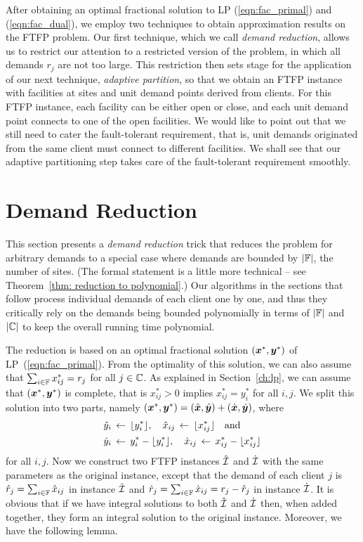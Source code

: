 \documentclass[oneside,final]{ucr}
\begin{document}
After obtaining an optimal fractional solution to LP
(\ref{eqn:fac_primal}) and (\ref{eqn:fac_dual}), we employ
two techniques to obtain approximation results on the FTFP
problem. Our first technique, which we call \emph{demand
  reduction}, allows us to restrict our attention to a
restricted version of the {\FTFP} problem, in which all
demands $r_j$ are not too large. This restriction then sets
stage for the application of our next technique,
\emph{adaptive partition}, so that we obtain an FTFP
instance with facilities at sites and unit demand points
derived from clients. For this FTFP instance, each facility
can be either open or close, and each unit demand point
connects to one of the open facilities. We would like to
point out that we still need to cater the fault-tolerant
requirement, that is, unit demands originated from the same
client must connect to different facilities. We shall see
that our adaptive partitioning step takes care of the
fault-tolerant requirement smoothly.

\section{Demand Reduction}
\label{sec: polynomial demands}

This section presents a \emph{demand reduction} trick that
reduces the problem for arbitrary demands to a special case
where demands are bounded by $|\mathbb{F}|$, the number of
sites.  (The formal statement is a little more technical --
see Theorem~\ref{thm: reduction to polynomial}.)  Our
algorithms in the sections that follow process individual
demands of each client one by one, and thus they critically
rely on the demands being bounded polynomially in terms of
$|\mathbb{F}|$ and $|\mathbb{C}|$ to keep the overall running time polynomial.

The reduction is based on an optimal fractional solution
$(\boldsymbol{x}^\ast,\boldsymbol{y}^\ast)$ of LP~(\ref{eqn:fac_primal}). From
the optimality of this solution, we can also assume that
$\sum_{i\in\mathbb{F}} x^\ast_{ij} = r_j$ for all
$j\in\mathbb{C}$.  As explained in Section~\ref{ch:lp}, we
can assume that $(\boldsymbol{x}^\ast,\boldsymbol{y}^\ast)$ is complete, that is
$x^\ast_{ij} > 0$ implies $x^\ast_{ij} = y^\ast_i$ for all
$i,j$.  We split this solution into two parts, namely
$(\boldsymbol{x}^\ast,\boldsymbol{y}^\ast) = (\hat{\boldsymbol{x}},\hat{\boldsymbol{y}})+
(\dot{\boldsymbol{x}},\dot{\boldsymbol{y}})$, where
%
\begin{align*}
{\hat y}_i &\;{\,\leftarrow\,}\; { \lfloor y_i^\ast \rfloor }, \quad
			{\hat x}_{ij} \;{\,\leftarrow\,}\; { \lfloor x_{ij}^\ast \rfloor } \quad\textrm{and}
			\\
{\dot y}_i &\;{\,\leftarrow\,}\; y_i^\ast - { \lfloor y_i^\ast \rfloor }, \quad
 	{\dot x}_{ij} \;{\,\leftarrow\,}\; x_{ij}^\ast -  { \lfloor x_{ij}^\ast \rfloor }
\end{align*}
%
for all $i,j$. Now we construct two
FTFP instances $\hatcalI$ and $\dotcalI$ with the same
parameters as the original instance, except that the demand of each client $j$ is
${\hat r}_j = \sum_{i\in\mathbb{F}} {\hat x}_{ij}$ in instance $\hatcalI$ and
${\dot r}_j = \sum_{i\in\mathbb{F}} {\dot x}_{ij} = r_j - {\hat r}_j$ in instance $\dotcalI$. 
It is obvious that if we have integral solutions to both $\hatcalI$
and $\dotcalI$ then, when added together, they form an integral
solution to the original instance.  Moreover, we have the
following lemma.
\end{document}
